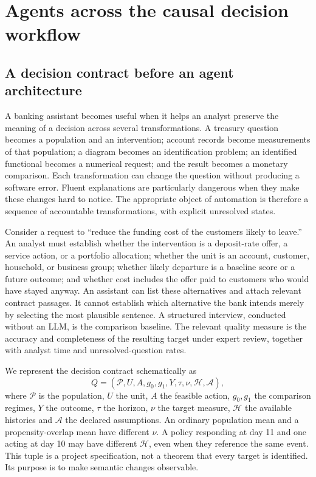 \chapter{Agents across the causal decision workflow}
\label{ch:la04-workflow}

\section{A decision contract before an agent architecture}

A banking assistant becomes useful when it helps an analyst preserve the meaning
of a decision across several transformations. A treasury question becomes a
population and an intervention; account records become measurements of that
population; a diagram becomes an identification problem; an identified
functional becomes a numerical request; and the result becomes a monetary
comparison. Each transformation can change the question without producing a
software error. Fluent explanations are particularly dangerous when they make
these changes hard to notice. The appropriate object of automation is therefore
a sequence of accountable transformations, with explicit unresolved states.

Consider a request to ``reduce the funding cost of the customers likely to
leave.'' An analyst must establish whether the intervention is a deposit-rate
offer, a service action, or a portfolio allocation; whether the unit is an
account, customer, household, or business group; whether likely departure is a
baseline score or a future outcome; and whether cost includes the offer paid to
customers who would have stayed anyway. An assistant can list these alternatives
and attach relevant contract passages. It cannot establish which alternative
the bank intends merely by selecting the most plausible sentence. A structured
interview, conducted without an LLM, is the comparison baseline. The relevant
quality measure is the accuracy and completeness of the resulting target under
expert review, together with analyst time and unresolved-question rates.

We represent the decision contract schematically as
\[
 Q=(\mathcal P,U,A,g_0,g_1,Y,\tau,\nu,\mathcal H,\mathcal A),
\]
where $\mathcal P$ is the population, $U$ the unit, $A$ the feasible action,
$g_0,g_1$ the comparison regimes, $Y$ the outcome, $\tau$ the horizon, $\nu$ the
target measure, $\mathcal H$ the available histories and $\mathcal A$ the declared
assumptions. An ordinary population mean and a propensity-overlap mean have
different $\nu$. A policy responding at day 11 and one acting at day 10 may have
different $\mathcal H$, even when they reference the same event. This tuple is a
project specification, not a theorem that every target is identified. Its
purpose is to make semantic changes observable.

